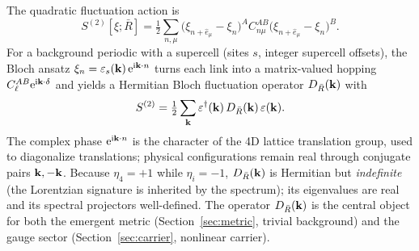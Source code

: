 The quadratic fluctuation action is
\begin{equation}
  S^{(2)}[\xi;\bar R]
  = \tfrac12\sum_{n,\mu}\bigl(\xi_{n+\hat e_\mu}-\xi_n\bigr)^{\!A}
    C_{n\mu}^{AB}\bigl(\xi_{n+\hat e_\mu}-\xi_n\bigr)^{\!B}.
  \label{eq:s2}
\end{equation}
For a background periodic with a supercell (sites $s$, integer supercell offsets), the
Bloch ansatz $\xi_{n}=\varepsilon_s(\mathbf{k})\,\mathrm{e}^{\mathrm{i} \mathbf{k}\cdot n}$ turns each link into a
matrix-valued hopping $C_\ell^{AB}\mathrm{e}^{\mathrm{i}\mathbf{k}\cdot\delta}$ and yields a Hermitian Bloch
fluctuation operator $D_{\bar R}(\mathbf{k})$ with
\begin{equation}
  S^{(2)}=\tfrac12\sum_{\mathbf{k}}\varepsilon^\dagger(\mathbf{k})\,D_{\bar R}(\mathbf{k})\,\varepsilon(\mathbf{k}).
  \label{eq:Dk}
\end{equation}
The complex phase $\mathrm{e}^{\mathrm{i}\mathbf{k}\cdot n}$ is the character of the 4D lattice translation
group, used to diagonalize translations; physical configurations remain real through
conjugate pairs $\mathbf{k},-\mathbf{k}$. Because $\eta_4=+1$ while $\eta_i=-1$, $D_{\bar R}(\mathbf{k})$
is Hermitian but \emph{indefinite} (the Lorentzian signature is inherited by the spectrum);
its eigenvalues are real and its spectral projectors well-defined. The operator
$D_{\bar R}(\mathbf{k})$ is the central object for both the emergent metric
(Section~\ref{sec:metric}, trivial background) and the gauge sector
(Section~\ref{sec:carrier}, nonlinear carrier).
